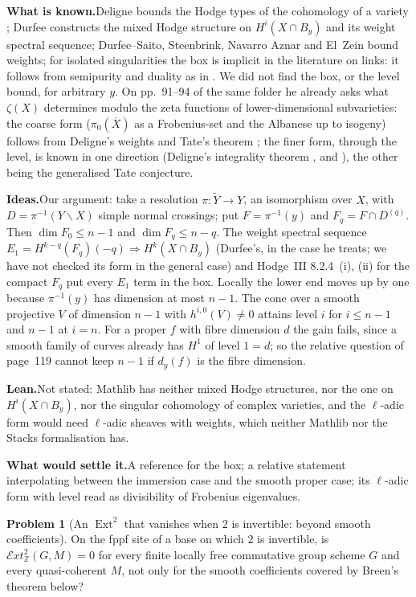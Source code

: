 \documentclass[11pt]{article}
\newcommand{\Ext}{\operatorname{Ext}}
\theoremstyle{definition}
\newtheorem{problem}{Problem}
\theoremstyle{plain}\newtheorem*{proposition}{Proposition}\theoremstyle{definition}
\newcommand{\entry}[1]{\par\medskip\noindent\textbf{#1}\enspace}
\newcommand{\known}{\entry{What is known.}}
\newcommand{\ideas}{\entry{Ideas.}}
\newcommand{\leanst}{\entry{Lean.}}
\newcommand{\settle}{\entry{What would settle it.}}
\begin{document}
\known Deligne bounds the Hodge types of the cohomology of a variety \cite[8.2.4]{hodge3}; Durfee constructs the mixed Hodge structure on $H^i(X \cap B_y)$ and its weight spectral sequence; Durfee--Saito, Steenbrink, Navarro Aznar and El~Zein bound weights; for isolated singularities the box is implicit in the literature on links: it follows from semipurity and duality as in \cite[Th.~2.6, Def.~2.7]{friedmanlaza}. We did not find the box, or the level bound, for arbitrary $y$. On pp.~91--94 of the same folder he already asks what $\zeta(X)$ determines modulo the zeta functions of lower-dimensional subvarieties: the coarse form ($\pi_0(\overline X)$ as a Frobenius-set and the Albanese up to isogeny) follows from Deligne's weights \cite{weil1} and Tate's theorem \cite{tate1966}; the finer form, through the level, is known in one direction (Deligne's integrality theorem \cite{sga7integralite}, and \cite{esnault2003}), the other being the generalised Tate conjecture.

\ideas Our argument: take a resolution $\pi : \tilde Y \to Y$, an isomorphism over $X$, with $D = \pi^{-1}(Y \smallsetminus X)$ simple normal crossings; put $F = \pi^{-1}(y)$ and $F_q = F \cap D^{(q)}$. Then $\dim F_0 \le n-1$ and $\dim F_q \le n-q$. The weight spectral sequence $E_1 = H^{k-q}(F_q)(-q) \Rightarrow H^k(X \cap B_y)$ (Durfee's, in the case he treats; we have not checked its form in the general case) and Hodge~III 8.2.4~(i), (ii) for the compact $F_q$ put every $E_1$ term in the box. Locally the lower end moves up by one because $\pi^{-1}(y)$ has dimension at most $n-1$. The cone over a smooth projective $V$ of dimension $n-1$ with $h^{i,0}(V) \ne 0$ attains level $i$ for $i \le n-1$ and $n-1$ at $i = n$. For a proper $f$ with fibre dimension $d$ the gain fails, since a smooth family of curves already has $H^1$ of level $1 = d$; so the relative question of page~119 cannot keep $n-1$ if $d_y(f)$ is the fibre dimension.

\leanst Not stated: Mathlib has neither mixed Hodge structures, nor the one on $H^i(X \cap B_y)$, nor the singular cohomology of complex varieties, and the $\ell$-adic form would need $\ell$-adic sheaves with weights, which neither Mathlib nor the Stacks formalisation \cite{axiomstacks} has.

\settle A reference for the box; a relative statement interpolating between the immersion case and the smooth proper case; its $\ell$-adic form with level read as divisibility of Frobenius eigenvalues.

\begin{problem}[An $\Ext^2$ that vanishes when $2$ is invertible: beyond smooth coefficients]\label{p:ext2}
On the fppf site of a base on which $2$ is invertible, is $\mathcal Ext^2_{\mathbb Z}(G, M) = 0$ for every finite locally free commutative group scheme $G$ and every quasi-coherent $M$, not only for the smooth coefficients covered by Breen's theorem below?
\end{problem}
\end{document}
